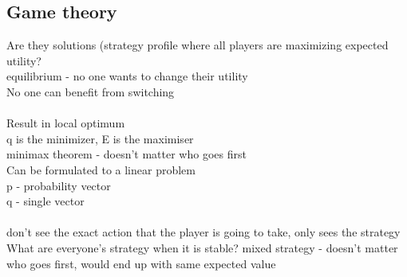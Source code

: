 \documentclass[11pt]{article}
\begin{document}
{\subsection*{Game theory}
Are they solutions (strategy profile where all players are maximizing expected utility?
\\
equilibrium - no one wants to change their utility\\
No one can benefit from switching\\\\
Result in local optimum
\\
q is the minimizer, E is the maximiser\\
minimax theorem - doesn't matter who goes first
\\ 
Can be formulated to a linear problem\\
p - probability vector\\
q - single vector\\
\\
don't see the exact action that the player is going to take, only sees the strategy
\\
What are everyone's strategy when it is stable?
mixed strategy - doesn't matter who goes first, would end up with same expected value\\
}
\end{document}
